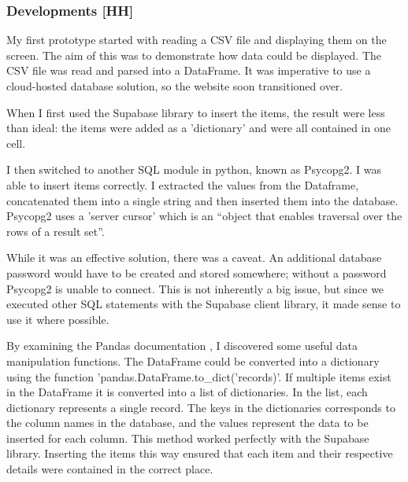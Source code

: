 \subsubsection{Developments [HH]}

My first prototype started with reading a CSV file and displaying them on the screen.
The aim of this was to demonstrate how data could be displayed.
The CSV file was read and parsed into a DataFrame.
It was imperative to use a cloud-hosted database solution, so the website soon transitioned over.

When I first used the Supabase library to insert the items, the result were less than ideal: the items were added as a 'dictionary' and were all contained in one cell.

I then switched to another SQL module in python, known as Psycopg2.
I was able to insert items correctly.
I extracted the values from the Dataframe, concatenated them into a single string and then inserted them into the database.
Psycopg2 uses a 'server cursor' which is an “object that enables traversal over the rows of a result set”.

While it was an effective solution, there was a caveat.
An additional database password would have to be created and stored somewhere; without a password Psycopg2 is unable to connect.
This is not inherently a big issue, but since we executed other SQL statements with the Supabase client library, it made sense to use it where possible.

By examining the Pandas documentation \cite{pd}, I discovered some useful data manipulation functions.
The DataFrame could be converted into a dictionary using the function 'pandas.DataFrame.to\_dict('records)'.
If multiple items exist in the DataFrame it is converted into a list of dictionaries.
 In the list, each dictionary represents a single record.
The keys in the dictionaries corresponds to the column names in the database, and the values represent the data to be inserted for each column.
This method worked perfectly with the Supabase library.
Inserting the items this way ensured that each item and their respective details were contained in the correct place.